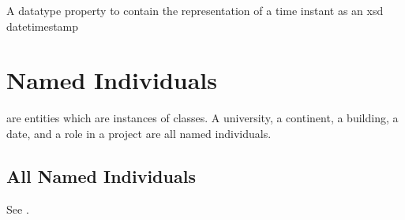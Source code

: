 \documentclass[letterpaper,10pt,english]{sphinxmanual}
\begin{document}
\begin{sphinxShadowBox}

\sphinxAtStartPar
{}
\end{sphinxShadowBox}

\begin{sphinxShadowBox}

\sphinxAtStartPar
A datatype property to contain the representation of a time instant as an xsd datetimestamp
\end{sphinxShadowBox}

\begin{sphinxShadowBox}

\sphinxAtStartPar
{}
\end{sphinxShadowBox}


\chapter{Named Individuals}
\label{\detokenize{named-individuals:named-individuals}}\label{\detokenize{named-individuals::doc}}
\sphinxAtStartPar
{} are entities which are instances of classes.  A university, a
continent, a building, a date, and a role in a project are all named individuals.


\section{All Named Individuals}
\label{\detokenize{named-individuals:all-named-individuals}}
\sphinxAtStartPar
See {\hyperref[\detokenize{named-individuals:table-9}]{}}.
\end{document}
